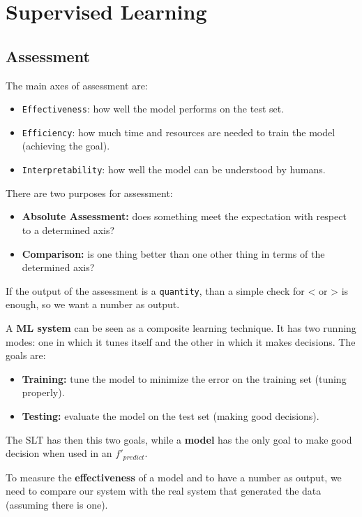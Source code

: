 
\chapter{Supervised Learning}

\section{Assessment}

The main axes of assessment are:
\begin{itemize}
    \item \texttt{Effectiveness}: how well the model performs on the test set.
    \item \texttt{Efficiency}: how much time and resources are needed to train the model (achieving the goal).
    \item \texttt{Interpretability}: how well the model can be understood by humans.
\end{itemize}

There are two purposes for assessment:
\begin{itemize}
    \item \textbf{Absolute Assessment:} does something meet the expectation with respect to a determined axis?
    \item \textbf{Comparison:} is one thing better than one other thing in terms of the determined axis? 
\end{itemize}

If the output of the assessment is a \texttt{quantity}, than a simple check for < or > is enough, so we want a number as output.

A \textbf{ML system} can be seen as a composite learning technique. It has two running modes: one in which it tunes itself and the other in which it makes decisions. The goals are:
\begin{itemize}
    \item \textbf{Training:} tune the model to minimize the error on the training set (tuning properly).
    \item \textbf{Testing:} evaluate the model on the test set (making good decisions).
\end{itemize}

The SLT has then this two goals, while a \textbf{model} has the only goal to make good decision when used in an $f'_{predict}$.

To measure the \textbf{effectiveness} of a model and to have a number as output, we need to compare our system with the real system that generated the data (assuming there is one).

